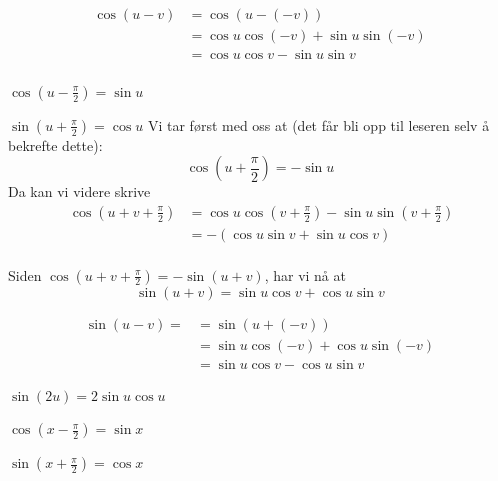 {
\begin{align*}
\cos (u-v)&= \cos (u-(-v)) \\
&= \cos u \cos (-v) + \sin u \sin (-v) \\
&= \cos u \cos v - \sin u \sin v 
\end{align*} \\

{\boldmath $ \cos\left(u-\frac{\pi}{2}\right)=\sin u $}

{\boldmath $ \sin \left(u + \frac{\pi}{2}\right)=\cos u $} 
\bs
Vi tar først med oss at (det får bli opp til leseren selv å bekrefte dette):
\[ \cos \left(u+\frac{\pi}{2}\right)=-\sin u \]
Da kan vi videre skrive
\begin{align*}\
\cos \left(u+ v+\frac{\pi}{2}\right) &= \cos u \cos \left(v+\frac{\pi}{2}\right) - \sin u \sin\left(v+\frac{\pi}{2}\right) \\
&= -(\cos u \sin v + \sin u \cos v )
\end{align*} 
\\
Siden  $ \cos \left(u+v+\frac{\pi}{2}\right) = -\sin (u+v) $, har vi nå at
\[\sin (u+v) = \sin u \cos v +\cos u \sin v \]

 \label{sin2xbevis}
\begin{align*}
\sin(u-v) =&=\sin (u+(-v)) \\
&= \sin u \cos (-v) + \cos u \sin (-v) \\
&= \sin u \cos v - \cos u \sin v 
\end{align*}

{\boldmath $ \sin (2u)=2\sin u \cos u $}

{\boldmath $ \cos\left(x-\frac{\pi}{2}\right)=\sin x $}

{\boldmath $ \sin\left(x+\frac{\pi}{2}\right)=\cos x $}
}






